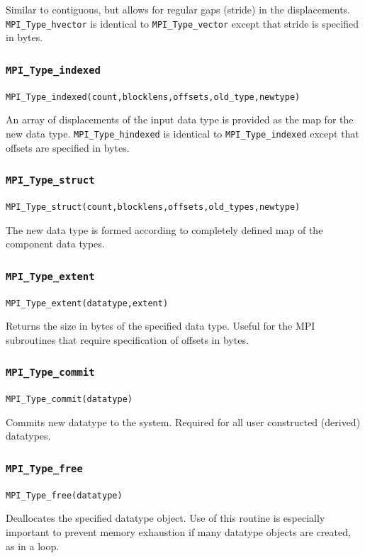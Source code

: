 Similar to contiguous, but allows for regular gaps (stride) in the displacements.  \texttt{MPI\_Type\_hvector} is identical to \texttt{MPI\_Type\_vector} except that stride is specified in bytes. 

\subsubsection{\texttt{MPI\_Type\_indexed}}
\texttt{MPI\_Type\_indexed(count,blocklens,offsets,old\_type,newtype) }

An array of displacements of the input data type is provided as the map for the new data type. \texttt{MPI\_Type\_hindexed} is identical to \texttt{MPI\_Type\_indexed} except that offsets are specified in bytes.  

\subsubsection{\texttt{MPI\_Type\_struct}}
\texttt{MPI\_Type\_struct(count,blocklens,offsets,old\_types,newtype) }

The new data type is formed according to completely defined map of the component data types.  

\subsubsection{\texttt{MPI\_Type\_extent}}
\texttt{MPI\_Type\_extent(datatype,extent) }

Returns the size in bytes of the specified data type. Useful for the MPI subroutines that require specification of offsets in bytes.  

\subsubsection{\texttt{MPI\_Type\_commit}}
\texttt{MPI\_Type\_commit(datatype) }

Commits new datatype to the system. Required for all user constructed (derived) datatypes.  

\subsubsection{\texttt{MPI\_Type\_free}}
\texttt{MPI\_Type\_free(datatype)}

Deallocates the specified datatype object. Use of this routine is especially important to prevent memory exhaustion if many datatype objects are created, as in a loop.  

